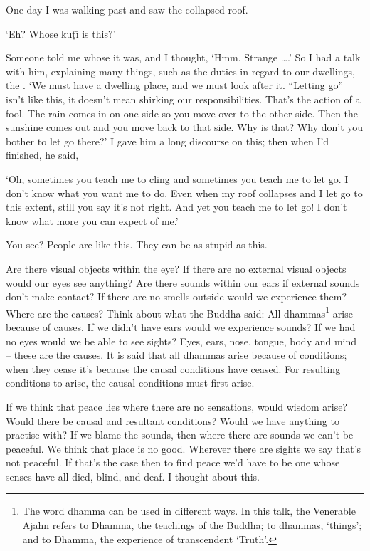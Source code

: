 One day I was walking past and saw the collapsed roof. 

`Eh? Whose ku\d{t}\={\i}  is this?' 

Someone told me whose it was, and I thought, `Hmm. Strange \ldots{}.' So I had a talk with him, explaining many things, such as the duties in regard to our dwellings, the . `We must have a dwelling place, and we must look after it. ``Letting go'' isn't like this, it doesn't mean shirking our responsibilities. That's the action of a fool. The rain comes in on one side so you move over to the other side. Then the sunshine comes out and you move back to that side. Why is that? Why don't you bother to let go there?' I gave him a long discourse on this; then when I'd finished, he said, 

`Oh,  sometimes you teach me to cling and sometimes you teach me to let go. I don't know what you want me to do. Even when my roof collapses and I let go to this extent, still you say it's not right. And yet you teach me to let go! I don't know what more you can expect of me.' 

You see? People are like this. They can be as stupid as this. 

Are there visual objects within the eye? If there are no external visual objects would our eyes see anything? Are there sounds within our ears if external sounds don't make contact? If there are no smells outside would we experience them? Where are the causes? Think about what the Buddha said: All dhammas\footnote{The word dhamma can be used in different ways. In this talk, the Venerable Ajahn refers to Dhamma, the teachings of the Buddha; to dhammas, `things'; and to Dhamma, the experience of transcendent `Truth'.} arise because of causes. If we didn't have ears would we experience sounds? If we had no eyes would we be able to see sights? Eyes, ears, nose, tongue, body and mind -- these are the causes. It is said that all dhammas arise because of conditions; when they cease it's because the causal conditions have ceased. For resulting conditions to arise, the causal conditions must first arise. 

If we think that peace lies where there are no sensations, would wisdom arise? Would there be causal and resultant conditions? Would we have anything to practise with? If we blame the sounds, then where there are sounds we can't be peaceful. We think that place is no good. Wherever there are sights we say that's not peaceful. If that's the case then to find peace we'd have to be one whose senses have all died, blind, and deaf. I thought about this.

